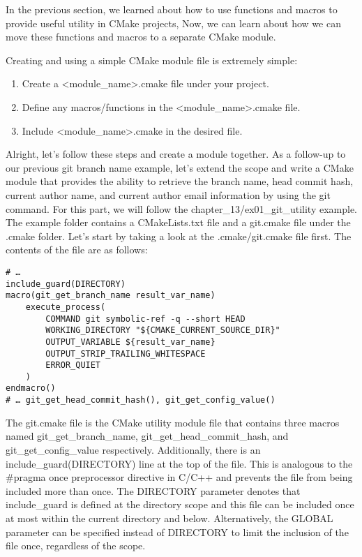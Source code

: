 
In the previous section, we learned about how to use functions and macros to provide useful utility in CMake projects, Now, we can learn about how we can move these functions and macros to a separate CMake module.

Creating and using a simple CMake module file is extremely simple:

\begin{enumerate}
\item 
Create a <module\_name>.cmake file under your project.

\item 
Define any macros/functions in the <module\_name>.cmake file.

\item 
Include <module\_name>.cmake in the desired file.
\end{enumerate}

Alright, let's follow these steps and create a module together. As a follow-up to our previous git branch name example, let's extend the scope and write a CMake module that provides the ability to retrieve the branch name, head commit hash, current author name, and current author email information by using the git command. For this part, we will follow the chapter\_13/ex01\_git\_utility example. The example folder contains a CMakeLists.txt file and a git.cmake file under the .cmake folder. Let's start by taking a look at the .cmake/git.cmake file first. The contents of the file are as follows:

\begin{lstlisting}[style=styleCMake]
# …
include_guard(DIRECTORY)
macro(git_get_branch_name result_var_name)
	execute_process(
		COMMAND git symbolic-ref -q --short HEAD
		WORKING_DIRECTORY "${CMAKE_CURRENT_SOURCE_DIR}"
		OUTPUT_VARIABLE ${result_var_name}
		OUTPUT_STRIP_TRAILING_WHITESPACE
		ERROR_QUIET
	)
endmacro()
# … git_get_head_commit_hash(), git_get_config_value()
\end{lstlisting}

The git.cmake file is the CMake utility module file that contains three macros named git\_get\_branch\_name, git\_get\_head\_commit\_hash, and git\_get\_config\_value respectively. Additionally, there is an include\_guard(DIRECTORY) line at the top of the file. This is analogous to the \#pragma once preprocessor directive in C/C++ and prevents the file from being included more than once. The DIRECTORY parameter denotes that include\_guard is defined at the directory scope and this file can be included once at most within the current directory and below. Alternatively, the GLOBAL parameter can be specified instead of DIRECTORY to limit the inclusion of the file once, regardless of the scope.


